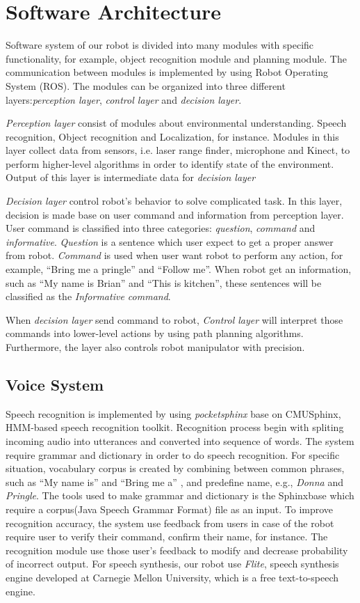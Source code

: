 \documentclass{llncs}
\newcommand{\dq}[1]{``#1''}
\begin{document}
\section{Software Architecture}
Software system of our robot is divided into many modules with specific functionality, for example, object recognition module and planning module. The communication between modules is implemented by using Robot Operating System (ROS). The modules can be organized into three different layers:\textit{perception layer}, \textit{control layer} and \textit{decision layer}.

\textit{Perception layer} consist of modules about environmental understanding. Speech recognition, Object recognition and Localization, for instance. Modules in this layer collect data from sensors, i.e. laser range finder, microphone and Kinect, to perform higher-level algorithms in order to identify state of the environment. Output of this layer is intermediate data for \textit{decision layer}

\textit{Decision layer} control robot's behavior to solve complicated task. In this layer, decision is made base on user command and information from perception layer. User command is classified into three categories: \textit{question}, \textit{command} and \textit{informative}. \textit{Question} is a sentence which user expect to get a proper answer from robot. \textit{Command} is used when user want robot to perform any action, for example, \dq{Bring me a pringle} and \dq{Follow me}. When robot get an information, such as \dq{My name is Brian} and \dq{This is kitchen}, these sentences will be classified as the \textit{Informative command}.

When \textit{decision layer} send command to robot, \textit{Control layer} will interpret those commands into lower-level actions by using path planning algorithms. Furthermore, the layer also controls robot manipulator with precision.

\subsection{Voice System}

Speech recognition is implemented by using \textit{pocketsphinx} base on CMUSphinx, HMM-based speech recognition toolkit. Recognition process begin with spliting incoming audio into utterances and converted into sequence of words. The system require grammar and dictionary in order to do speech recognition. For specific situation, vocabulary corpus is created by combining between common phrases, such as \dq{My name is} and \dq{Bring me a} , and predefine name, e.g., \textit{Donna} and \textit{Pringle}. The tools used to make grammar and dictionary is the Sphinxbase which require a corpus(Java Speech Grammar Format) file as an input. To improve recognition accuracy, the system use feedback from users in case of the robot require user to verify their command, confirm their name, for instance. The recognition module use those user's feedback to modify and decrease probability of incorrect output. For speech synthesis, our robot use \textit{Flite}, speech synthesis engine developed at Carnegie Mellon University, which is a free text-to-speech engine. 
\end{document}
